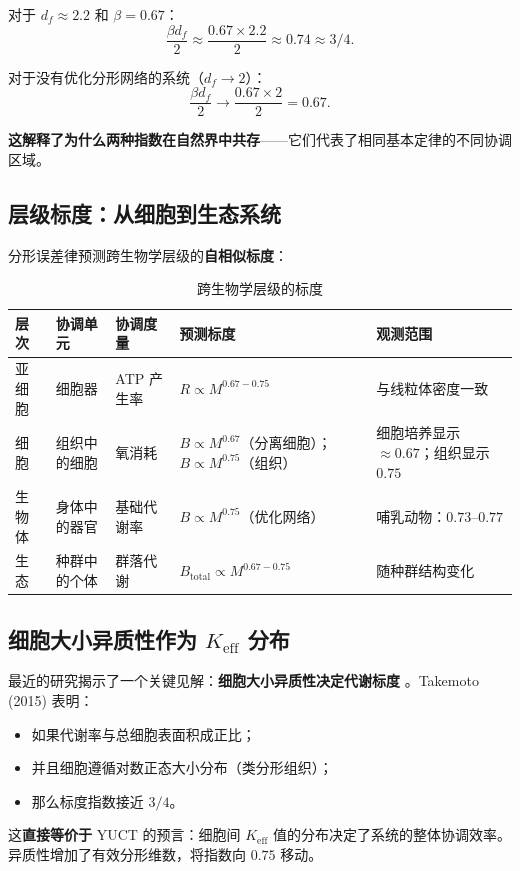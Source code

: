 \documentclass[12pt]{article}
\newcommand{\Keff}{K_{\mathrm{eff}}}
\begin{document}
	对于 \(d_f \approx 2.2\) 和 \(\beta = 0.67\)：
	\begin{equation}
		\frac{\beta d_f}{2} \approx \frac{0.67 \times 2.2}{2} \approx 0.74 \approx 3/4.
	\end{equation}
	
	对于没有优化分形网络的系统（\(d_f \to 2\)）：
	\begin{equation}
		\frac{\beta d_f}{2} \to \frac{0.67 \times 2}{2} = 0.67.
	\end{equation}
	
	\textbf{这解释了为什么两种指数在自然界中共存}——它们代表了相同基本定律的不同协调区域。
	
	\subsection{层级标度：从细胞到生态系统}
	
	分形误差律预测跨生物学层级的\textbf{自相似标度}：
	
	\begin{table}[htbp]
		\centering
		\caption{跨生物学层级的标度}
		\label{tab:hierarchical-scaling}
		\begin{tabular}{p{3cm} p{3cm} p{3.5cm} p{2.5cm} p{3cm}}
			\toprule
			\textbf{层次} & \textbf{协调单元} & \textbf{协调度量} & \textbf{预测标度} & \textbf{观测范围} \\
			\midrule
			亚细胞 & 细胞器 & ATP 产生率 & \(R \propto M^{0.67-0.75}\) & 与线粒体密度一致 \cite{West2002} \\
			细胞 & 组织中的细胞 & 氧消耗 & \(B \propto M^{0.67}\)（分离细胞）；\(B \propto M^{0.75}\)（组织） & 细胞培养显示 \(\approx 0.67\)；组织显示 \(0.75\) \cite{West2002} \\
			生物体 & 身体中的器官 & 基础代谢率 & \(B \propto M^{0.75}\)（优化网络） & 哺乳动物：\(0.73\)–\(0.77\) \cite{Kleiber1932} \\
			生态 & 种群中的个体 & 群落代谢 & \(B_{\text{total}} \propto M^{0.67-0.75}\) & 随种群结构变化 \cite{Glazier2005} \\
			\bottomrule
		\end{tabular}
	\end{table}
	
	\subsection{细胞大小异质性作为 \(\Keff\) 分布}
	
	最近的研究揭示了一个关键见解：\textbf{细胞大小异质性决定代谢标度} \cite{Takemoto2015}。Takemoto (2015) 表明：
	\begin{itemize}
		\item 如果代谢率与总细胞表面积成正比；
		\item 并且细胞遵循对数正态大小分布（类分形组织）；
		\item 那么标度指数接近 \(3/4\)。
	\end{itemize}
	这\textbf{直接等价于} YUCT 的预言：细胞间 \(\Keff\) 值的分布决定了系统的整体协调效率。异质性增加了有效分形维数，将指数向 \(0.75\) 移动。
	
\end{document}

